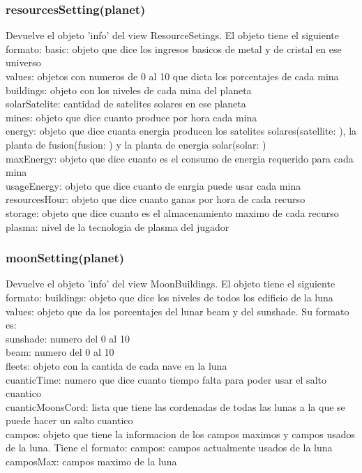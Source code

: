 \documentclass{article}
\newcommand\tab[1][1cm]{\hspace*{#1}}
\begin{document}
        \subsubsection{resourcesSetting(planet)}
            Devuelve el objeto 'info' del view ResourceSetings. El objeto tiene el siguiente formato:
            \tab basic: objeto que dice los ingresos basicos de metal y de cristal en ese universo\\
            \tab values: objetos con numeros de 0 al 10 que dicta los porcentajes de cada mina\\
            \tab buildings: objeto con los niveles de cada mina del planeta\\
            \tab solarSatelite: cantidad de satelites solares en ese planeta\\
            \tab mines: objeto que dice cuanto produce por hora cada mina\\
            \tab energy: objeto que dice cuanta energia producen los satelites solares(satellite: ), la planta de fusion(fusion: ) y la planta de energia solar(solar: )\\
            \tab maxEnergy: objeto que dice cuanto es el consumo de energia requerido para cada mina\\
            \tab usageEnergy: objeto que dice cuanto de enrgia puede usar cada mina\\
            \tab resourcesHour: objeto que dice cuanto ganas por hora de cada recurso\\
            \tab storage: objeto que dice cuanto es el almacenamiento maximo de cada recurso\\
            \tab plasma: nivel de la tecnologia de plasma del jugador\\
        \subsubsection{moonSetting(planet)}
          Devuelve el objeto 'info' del view MoonBuildings. El objeto tiene el siguiente formato:
          \tab buildings: objeto que dice los niveles de todos los edificio de la luna\\
          \tab values: objeto que da los porcentajes del lunar beam y del sunshade. Su formato es:\\
          \tab\tab sunshade: numero del 0 al 10\\
          \tab\tab beam: numero del 0 al 10\\
          \tab fleets: objeto con la cantida de cada nave en la luna\\
          \tab cuanticTime: numero que dice cuanto tiempo falta para poder usar el salto cuantico\\
          \tab cuanticMoonsCord: lista que tiene las cordenadas de todas las lunas a la que se puede hacer un salto cuantico\\
          \tab campos: objeto que tiene la informacion de los campos maximos y campos usados de la luna. Tiene el formato:
          \tab\tab campos: campos actualmente usados de la luna\\
          \tab\tab camposMax: campos maximo de la luna\\
\end{document}
